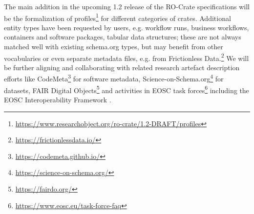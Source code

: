 The main addition in the upcoming 1.2 release of the RO-Crate
specifications will be the formalization of
profiles\footnote{\url{https://www.researchobject.org/ro-crate/1.2-DRAFT/profiles}}
for different categories of crates. Additional entity types have been
requested by users, e.g. workflow runs, business workflows, containers
and software packages, tabular data structures; these are not always
matched well with existing schema.org types, but may benefit from other
vocabularies or even separate metadata files, e.g. from Frictionless
Data.\footnote{\url{https://frictionlessdata.io/}} We will be further aligning
and collaborating with related research artefact description efforts
like CodeMeta\footnote{\url{https://codemeta.github.io/}} for software metadata,
Science-on-Schema.org\footnote{\url{https://science-on-schema.org/}}
\cite{Jones 2021} for datasets, FAIR Digital
Objects\footnote{\url{https://fairdo.org/}} \cite{De Smedt 2020} and
activities in EOSC task forces\footnote{\url{https://www.eosc.eu/task-force-faq}}
including the EOSC Interoperability Framework \cite{Kurowski 2021}.
